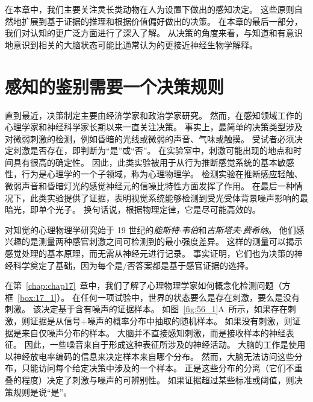 在本章中，我们主要关注灵长类动物在人为设置下做出的感知决定。
这些原则自然地扩展到基于证据的推理和根据价值偏好做出的决策。
在本章的最后一部分，我们对认知的更广泛方面进行了深入了解。
从决策的角度来看，与知道和有意识地意识到相关的大脑状态可能比通常认为的更接近神经生物学解释。



\section{感知的鉴别需要一个决策规则}

直到最近，决策制定主要由经济学家和政治学家研究。
然而，在感知领域工作的心理学家和神经科学家长期以来一直关注决策。
事实上，最简单的决策类型涉及对微弱刺激的检测，例如昏暗的光线或微弱的声音、气味或触摸。
受试者必须决定刺激是否存在，即判断为“是”或“否”。
在实验室中，刺激可能出现的地点和时间具有很高的确定性。
因此，此类实验被用于从行为推断感觉系统的基本敏感性，行为是心理学的一个子领域，称为心理物理学。
检测实验在推断感应轻触、微弱声音和昏暗灯光的感觉神经元的信噪比特性方面发挥了作用。
在最后一种情况下，此类实验提供了证据，表明视觉系统能够检测到受光受体背景噪声影响的最暗光，即单个光子。
换句话说，根据物理定律，它是尽可能高效的。


对知觉的心理物理学研究始于 19 世纪的\textit{能斯特$\cdot$韦伯}和\textit{古斯塔夫$\cdot$费希纳}。
他们感兴趣的是测量两种感官刺激之间可检测到的最小强度差异。
这样的测量可以揭示感觉处理的基本原理，而无需从神经元进行记录。
事实证明，它们也为决策的神经科学奠定了基础，因为每个是/否答案都是基于感官证据的选择。


在第~\ref{chap:chap17}~章中，我们了解了心理物理学家如何概念化检测问题（方框~\ref{box:17_1}）。
在任何一项试验中，世界的状态要么是存在刺激，要么是没有刺激。
该决定基于含有噪声的证据样本。
如图~\ref{fig:56_1}A~所示，如果存在刺激，则证据是从信号+噪声的概率分布中抽取的随机样本。
如果没有刺激，则证据是来自仅噪声分布的样本。
大脑并不直接感知刺激，而是接收样本的神经表征。
因此，一些噪音来自于形成这种表征所涉及的神经活动。
大脑的工作是使用以神经放电率编码的信息来决定样本来自哪个分布。
然而，大脑无法访问这些分布，只能访问每个给定决策中涉及的一个样本。
正是这些分布的分离（它们不重叠的程度）决定了刺激与噪声的可辨别性。
如果证据超过某些标准或阈值，则决策规则是说“是”。


